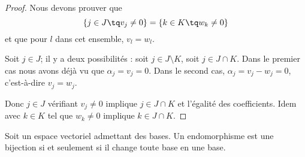\begin{proof}
    Nous devons prouver que
    \begin{equation}
        \{ j\in J \tq v_j\neq 0 \}=\{ k\in K\tq w_k\neq 0 \}
    \end{equation}
    et que pour \( l\) dans cet ensemble, \( v_l=w_l\).

    Soit \( j\in J\); il y a deux possibilités : soit \( j\in J\setminus K\), soit \( j\in J\cap K\). Dans le premier cas nous avons déjà vu que \( \alpha_j=v_j=0\). Dans le second cas, \( \alpha_j=v_j-w_j=0\), c'est-à-dire \( v_j=w_j\).

    Donc \( j\in J\) vérifiant \( v_j\neq 0\) implique \( j\in J\cap K\) et l'égalité des coefficients. Idem avec \( k\in K\) tel que \( w_k\neq 0\) implique \( k\in J\cap K\).
\end{proof}

\begin{lemma}        \label{LEMooDJSIooYcsvhO}
    Soit un espace vectoriel admettant des bases. Un endomorphisme est une bijection si et seulement si il change toute base en une base.
\end{lemma}

